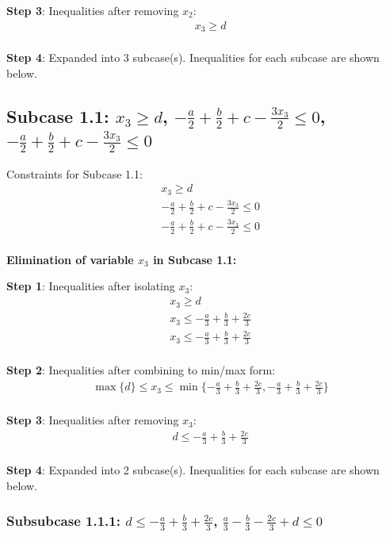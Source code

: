 \documentclass{article}
\begin{document}
\textbf{Step 3}: Inequalities after removing $x_{2}$:
\begin{align}
& x_{3} \geq d \\
\end{align}

\textbf{Step 4}: Expanded into 3 subcase(s). Inequalities for each subcase are shown below.

\subsection{Subcase 1.1: $x_{3} \geq d$, $- \frac{a}{2} + \frac{b}{2} + c - \frac{3 x_{3}}{2} \leq 0$, $- \frac{a}{2} + \frac{b}{2} + c - \frac{3 x_{3}}{2} \leq 0$}

Constraints for Subcase 1.1:
\begin{align}
& x_{3} \geq d \\
& - \frac{a}{2} + \frac{b}{2} + c - \frac{3 x_{3}}{2} \leq 0 \\
& - \frac{a}{2} + \frac{b}{2} + c - \frac{3 x_{3}}{2} \leq 0 \\
\end{align}

\textbf{Elimination of variable $x_{3}$ in Subcase 1.1:}

\textbf{Step 1}: Inequalities after isolating $x_{3}$:
\begin{align}
& x_{3} \geq d \\
& x_{3} \leq - \frac{a}{3} + \frac{b}{3} + \frac{2 c}{3} \\
& x_{3} \leq - \frac{a}{3} + \frac{b}{3} + \frac{2 c}{3} \\
\end{align}

\textbf{Step 2}: Inequalities after combining to min/max form:
\begin{align}
& \max\{d\} \leq x_{3} \leq \min\{- \frac{a}{3} + \frac{b}{3} + \frac{2 c}{3}, - \frac{a}{3} + \frac{b}{3} + \frac{2 c}{3}\} \\
\end{align}

\textbf{Step 3}: Inequalities after removing $x_{3}$:
\begin{align}
& d \leq - \frac{a}{3} + \frac{b}{3} + \frac{2 c}{3} \\
\end{align}

\textbf{Step 4}: Expanded into 2 subcase(s). Inequalities for each subcase are shown below.

\subsubsection{Subsubcase 1.1.1: $d \leq - \frac{a}{3} + \frac{b}{3} + \frac{2 c}{3}$, $\frac{a}{3} - \frac{b}{3} - \frac{2 c}{3} + d \leq 0$}
\end{document}
